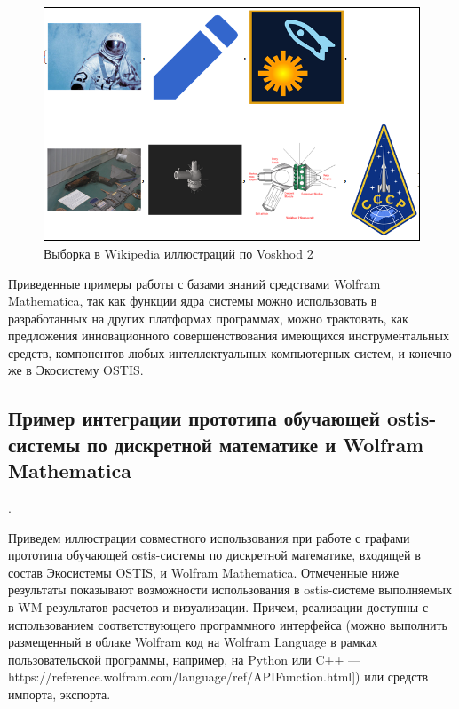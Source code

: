 \begin{figure}[H]
	\includegraphics[scale=0.56]{images/part7/chapter_integration/integr_alg7.png}
	\caption{Выборка в Wikipedia иллюстраций по Voskhod 2}
	\label{fig:integr_alg7}
\end{figure}

Приведенные примеры работы с базами знаний средствами Wolfram Mathematica, так как функции ядра системы можно использовать в разработанных на других платформах программах, можно трактовать, как предложения инновационного совершенствования имеющихся инструментальных средств, компонентов любых интеллектуальных компьютерных систем, и конечно же в Экосистему OSTIS. 

\subsection{Пример интеграции прототипа обучающей ostis-системы по дискретной математике и Wolfram Mathematica}.
\label{subsec_cas_intergation}

Приведем иллюстрации совместного использования при работе с графами прототипа обучающей ostis-системы по дискретной математике, входящей в состав Экосистемы OSTIS, и Wolfram Mathematica. Отмеченные ниже результаты показывают возможности использования в ostis-системе выполняемых в WM результатов расчетов и визуализации. Причем, реализации доступны с использованием соответствующего программного интерфейса (можно выполнить размещенный в облаке Wolfram код на Wolfram Language в рамках пользовательской программы, например, на Python или C++ --- https://reference.wolfram.com/language/ref/APIFunction.html]) или средств импорта, экспорта. 

